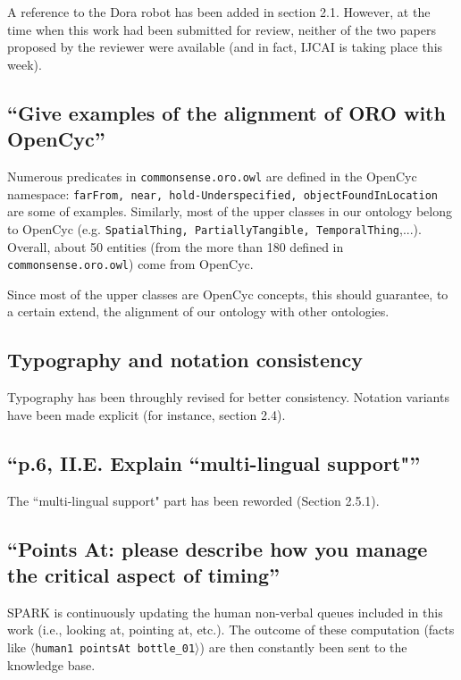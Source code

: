 \documentclass[11pt]{article}
\begin{document}
A reference to the Dora robot has been added in section 2.1. However, at the
time when this work had been submitted for review, neither of the two papers proposed
by the reviewer were available (and in fact, IJCAI is taking place this
week).

\subsection{``Give examples of the alignment of ORO with OpenCyc''}

Numerous predicates in {\tt commonsense.oro.owl} are defined in the OpenCyc
namespace: {\tt farFrom, near, hold-Underspecified, objectFoundInLocation} are
some of examples. Similarly, most of the upper classes in our ontology belong
to OpenCyc (e.g. {\tt SpatialThing, PartiallyTangible, TemporalThing},...).
Overall, about 50 entities (from the more than 180 defined in {\tt
commonsense.oro.owl}) come from OpenCyc.

Since most of the upper classes are OpenCyc concepts, this should 
guarantee, to a certain extend, the alignment of our ontology with other ontologies.

\subsection{Typography and notation consistency}

Typography has been throughly revised for better consistency. Notation variants have been
made explicit (for instance, section 2.4).

\subsection{``p.6, II.E. Explain ``multi-lingual support"''}

The ``multi-lingual support" part has been reworded (Section 2.5.1).

\subsection{``Points At: please describe how you manage the critical aspect of
timing''}

SPARK is continuously updating the human non-verbal queues included in this
work (i.e., looking at, pointing at, etc.). The outcome of these computation
(facts like {\tt $\langle$human1 pointsAt bottle\_01$\rangle$}) are then
constantly been sent to the knowledge base.
\end{document}
